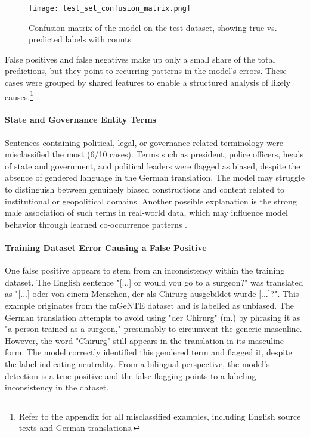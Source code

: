         \begin{figure}[ht]
            \centering
            \texttt{[image: test\_set\_confusion\_matrix.png]}
            \caption[Confusion matrix on the test dataset]{Confusion matrix of the model on the test dataset, showing true vs. predicted labels with counts}
            \label{fig:test_confusion_matrix}
        \end{figure}

    False positives and false negatives make up only a small share of the total predictions, but they point to recurring patterns in the model's errors. These cases were grouped by shared features to enable a structured analysis of likely causes.\footnote{Refer to the appendix for all misclassified examples, including English source texts and German translations.}

    \paragraph{State and Governance Entity Terms}

    Sentences containing political, legal, or governance-related terminology were misclassified the most (6/10 cases). Terms such as president, police officers, heads of state and government, and political leaders were flagged as biased, despite the absence of gendered language in the German translation. The model may struggle to distinguish between genuinely biased constructions and content related to institutional or geopolitical domains. Another possible explanation is the strong male association of such terms in real-world data, which may influence model behavior through learned co-occurrence patterns \parencite{kroeberItsLongWay2022}.

    \paragraph{Training Dataset Error Causing a False Positive}

    One false positive appears to stem from an inconsistency within the training dataset. The English sentence "[...] or would you go to a surgeon?" was translated as "[...] oder von einem Menschen, der als Chirurg ausgebildet wurde [...]?". This example originates from the mGeNTE dataset and is labelled as unbiased. The German translation attempts to avoid using "der Chirurg" (m.) by phrasing it as "a person trained as a surgeon," presumably to circumvent the generic masculine. However, the word "Chirurg" still appears in the translation in its masculine form. The model correctly identified this gendered term and flagged it, despite the label indicating neutrality. From a bilingual perspective, the model's detection is a true positive and the false flagging points to a labeling inconsistency in the dataset.

